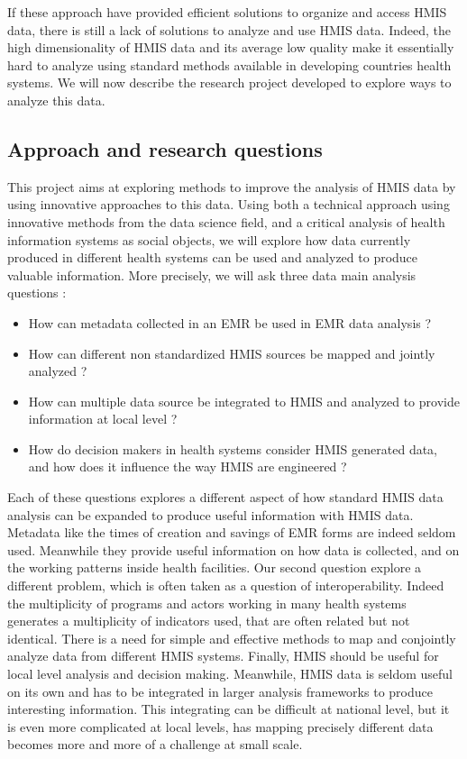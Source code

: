If these approach have provided efficient solutions to organize and access HMIS data, there is still a lack of solutions to analyze and use HMIS data. Indeed, the high dimensionality of HMIS data and its average low quality make it essentially hard to analyze using standard methods available in developing countries health systems. We will now describe the research project developed to explore ways to analyze this data.


\subsection{Approach and research questions}


This project aims at exploring methods to improve the analysis of HMIS data by using innovative approaches to this data. Using both a technical approach using innovative methods from the data science field, and a critical analysis of health information systems as social objects, we will explore how data currently produced in different health systems can be used and analyzed to produce valuable information. More precisely, we will ask three data main analysis questions :
\begin{itemize}
\item How can metadata collected in an EMR be used in EMR data analysis ?
\item How can different non standardized HMIS sources be mapped and jointly analyzed ?
\item How can multiple data source be integrated to HMIS and analyzed to provide information at local level ?
\item How do decision makers in health systems consider HMIS generated data, and how does it influence the way HMIS are engineered ?
\end{itemize}

Each of these questions explores a different aspect of how standard HMIS data analysis can be expanded to produce useful information with HMIS data. Metadata like the times of creation and savings of EMR forms are indeed seldom used. Meanwhile they provide useful information on how data is collected, and on the working patterns inside health facilities. Our second question explore a different problem, which is often taken as a question of interoperability. Indeed the multiplicity of programs and actors working in many health systems generates a multiplicity of indicators used, that are often related but not identical. There is a need for simple and effective methods to map and conjointly analyze data from different HMIS systems. Finally, HMIS should be useful for local level analysis and decision making. Meanwhile, HMIS data is seldom useful on its own and has to be integrated in larger analysis frameworks to produce interesting information. This integrating can be difficult at national level, but it is even more complicated at local levels, has mapping precisely different data becomes more and more of a challenge at small scale.

